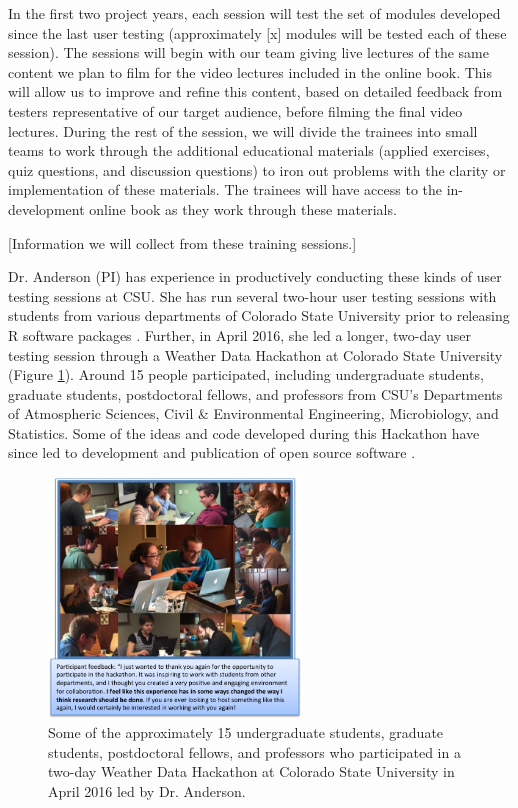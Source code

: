 \documentclass[pdftex,english,11pt,parskip=half]{scrartcl}
\begin{document}
In the first two project years, each session will test the set of modules
developed since the last user testing (approximately [x] modules will be tested
each of these session). The sessions will begin with our team giving live
lectures of the same content we plan to film for the video lectures included in
the online book. This will allow us to improve and refine this content, based on
detailed feedback from testers representative of our target audience, before
filming the final video lectures. During the rest of the session, we will divide
the trainees into small teams to work through the additional educational
materials (applied exercises, quiz questions, and discussion questions) to iron
out problems with the clarity or implementation of these materials. The trainees
will have access to the in-development online book as they work through these
materials.

[Information we will collect from these training sessions.]

Dr. Anderson (PI) has experience in productively conducting these kinds of user
testing sessions at CSU. She has run several two-hour user testing sessions with
students from various departments of Colorado State University prior to
releasing R software packages \cite{futureheatwaves, countyweather}. Further, in
April 2016, she led a longer, two-day user testing session through a Weather
Data Hackathon at Colorado State University (Figure \ref{csu-r-hackathon}).
Around 15 people participated, including undergraduate students, graduate
students, postdoctoral fellows, and professors from CSU's Departments of
Atmospheric Sciences, Civil \& Environmental Engineering, Microbiology, and
Statistics. Some of the ideas and code developed during this Hackathon have
since led to development and publication of open source software
\cite{countyfloods, noaastormevents}.

\begin{figure} \centering \includegraphics[width =
0.6\textwidth]{figures/csu_hackathon.png} \caption{Some of the approximately 15
undergraduate students, graduate students, postdoctoral fellows, and professors
who participated in a two-day Weather Data Hackathon at Colorado State
University in April 2016 led by Dr. Anderson.} \label{csu-r-hackathon}
\end{figure}
\end{document}
